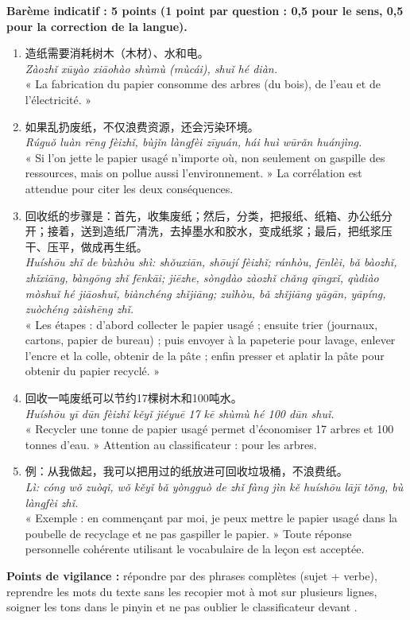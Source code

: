 \documentclass[11pt]{article}
\newcommand{\zh}[1]{\ifmmode\text{#1}\else{#1}\fi}
\begin{document}
\begin{corrige}
\textbf{Barème indicatif : 5 points (1 point par question : 0,5 pour le sens, 0,5 pour la correction de la langue).}

\begin{enumerate}
    \item 造纸需要消耗树木（木材）、水和电。\\ \emph{Zàozhǐ xūyào xiāohào shùmù (mùcái), shuǐ hé diàn.}\\ « La fabrication du papier consomme des arbres (du bois), de l'eau et de l'électricité. »
    \item 如果乱扔废纸，不仅浪费资源，还会污染环境。\\ \emph{Rúguǒ luàn rēng fèizhǐ, bùjǐn làngfèi zīyuán, hái huì wūrǎn huánjìng.}\\ « Si l'on jette le papier usagé n'importe où, non seulement on gaspille des ressources, mais on pollue aussi l'environnement. » La corrélation \zh{不仅……还……} est attendue pour citer les deux conséquences.
    \item 回收纸的步骤是：首先，收集废纸；然后，分类，把报纸、纸箱、办公纸分开；接着，送到造纸厂清洗，去掉墨水和胶水，变成纸浆；最后，把纸浆压干、压平，做成再生纸。\\ \emph{Huíshōu zhǐ de bùzhòu shì: shǒuxiān, shōují fèizhǐ; ránhòu, fēnlèi, bǎ bàozhǐ, zhǐxiāng, bàngōng zhǐ fēnkāi; jiēzhe, sòngdào zàozhǐ chǎng qīngxǐ, qùdiào mòshuǐ hé jiāoshuǐ, biànchéng zhǐjiāng; zuìhòu, bǎ zhǐjiāng yāgān, yāpíng, zuòchéng zàishēng zhǐ.}\\ « Les étapes : d'abord collecter le papier usagé ; ensuite trier (journaux, cartons, papier de bureau) ; puis envoyer à la papeterie pour lavage, enlever l'encre et la colle, obtenir de la pâte ; enfin presser et aplatir la pâte pour obtenir du papier recyclé. »
    \item 回收一吨废纸可以节约17棵树木和100吨水。\\ \emph{Huíshōu yī dūn fèizhǐ kěyǐ jiéyuē 17 kē shùmù hé 100 dūn shuǐ.}\\ « Recycler une tonne de papier usagé permet d'économiser 17 arbres et 100 tonnes d'eau. » Attention au classificateur : \zh{一棵} pour les arbres.
    \item 例：从我做起，我可以把用过的纸放进可回收垃圾桶，不浪费纸。\\ \emph{Lì: cóng wǒ zuòqǐ, wǒ kěyǐ bǎ yòngguò de zhǐ fàng jìn kě huíshōu lājī tǒng, bù làngfèi zhǐ.}\\ « Exemple : en commençant par moi, je peux mettre le papier usagé dans la poubelle de recyclage et ne pas gaspiller le papier. » Toute réponse personnelle cohérente utilisant le vocabulaire de la leçon est acceptée.
\end{enumerate}
\textbf{Points de vigilance :} répondre par des phrases complètes (sujet + verbe), reprendre les mots du texte sans les recopier mot à mot sur plusieurs lignes, soigner les tons dans le pinyin et ne pas oublier le classificateur \zh{棵} devant \zh{树木}.
\end{corrige}
\end{document}
